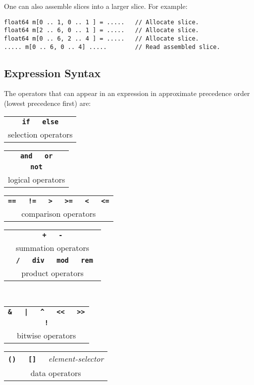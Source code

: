 \documentclass[12pt]{article}
\newcommand{\TT}[1]{{\tt \bfseries #1}}
\newenvironment{indpar}[1][0.3in]%
	{\begin{list}{}%
		     {\setlength{\itemsep}{0in}%
		      \setlength{\topsep}{0in}%
		      \setlength{\parsep}{1ex}%
		      \setlength{\labelwidth}{#1}%
		      \setlength{\leftmargin}{#1}%
		      \addtolength{\leftmargin}{\labelsep}}%
	 \item}%
	{\end{list}}
\begin{document}
One can also assemble slices into a larger slice.  For example:
\begin{indpar}\begin{verbatim}
float64 m[0 .. 1, 0 .. 1 ] = .....   // Allocate slice.
float64 m[2 .. 6, 0 .. 1 ] = .....   // Allocate slice.
float64 m[0 .. 6, 2 .. 4 ] = .....   // Allocate slice.
..... m[0 .. 6, 0 .. 4] .....        // Read assembled slice.
\end{verbatim}\end{indpar}

\subsection{Expression Syntax}

The operators that can appear in an expression in approximate
precedence order (lowest precedence first) are:

\begin{center}

\begin{tabular}{c}
\TT{if ~ else} \\
selection operators
\end{tabular}

\medskip

\begin{tabular}{c}
\TT{and ~ or} \\
\TT{not} \\
logical operators
\end{tabular}

\medskip

\begin{tabular}{c}
\TT{== ~ != ~ > ~ >= ~ < ~ <=} \\
comparison operators
\end{tabular}

\medskip

\begin{tabular}{c}
\TT{+ ~ -} \\
summation operators
\\[2ex]
\TT{* ~ / ~ div ~ mod ~ rem } \\
product operators
\end{tabular}
~~~~~
\begin{tabular}{c}
\TT{\& ~ | ~ \textasciicircum{} ~ <{}< ~ >{}>} \\
\TT{!} \\
bitwise operators
\end{tabular}

\medskip

\begin{tabular}{c}
\TT{() ~ [] ~ }{\em element-selector} \\
data operators
\end{tabular}

\end{center}
\end{document}
